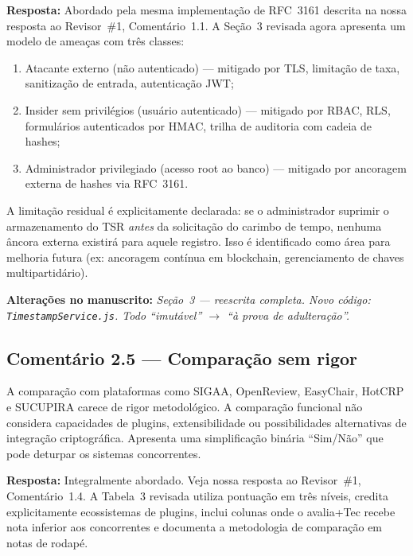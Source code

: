 \documentclass[11pt,a4paper]{article}
\newcommand{\response}[1]{\par\noindent\textcolor{responsecolor}{\textbf{Resposta:}} #1}
\newcommand{\change}[1]{\par\noindent\textcolor{changecolor}{\textbf{Alterações no manuscrito:}} \textit{#1}}
\begin{document}
\response{Abordado pela mesma implementação de RFC~3161 descrita na nossa resposta ao Revisor~\#1, Comentário~1.1. A Seção~3 revisada agora apresenta um modelo de ameaças com três classes:}

\begin{enumerate}[nosep]
  \item Atacante externo (não autenticado) --- mitigado por TLS, limitação de taxa, sanitização de entrada, autenticação JWT;
  \item Insider sem privilégios (usuário autenticado) --- mitigado por RBAC, RLS, formulários autenticados por HMAC, trilha de auditoria com cadeia de hashes;
  \item Administrador privilegiado (acesso root ao banco) --- mitigado por ancoragem externa de hashes via RFC~3161.
\end{enumerate}

\noindent A limitação residual é explicitamente declarada: se o administrador suprimir o armazenamento do TSR \emph{antes} da solicitação do carimbo de tempo, nenhuma âncora externa existirá para aquele registro. Isso é identificado como área para melhoria futura (ex: ancoragem contínua em blockchain, gerenciamento de chaves multipartidário).

\change{Seção~3 --- reescrita completa. Novo código: \texttt{TimestampService.js}. Todo ``imutável'' $\to$ ``à prova de adulteração''.}

\bigskip

\subsection*{Comentário 2.5 --- Comparação sem rigor}

\begin{reviewerbox}
A comparação com plataformas como SIGAA, OpenReview, EasyChair, HotCRP e SUCUPIRA carece de rigor metodológico. A comparação funcional não considera capacidades de plugins, extensibilidade ou possibilidades alternativas de integração criptográfica. Apresenta uma simplificação binária ``Sim/Não'' que pode deturpar os sistemas concorrentes.
\end{reviewerbox}

\response{Integralmente abordado. Veja nossa resposta ao Revisor~\#1, Comentário~1.4. A Tabela~3 revisada utiliza pontuação em três níveis, credita explicitamente ecossistemas de plugins, inclui colunas onde o avalia+Tec recebe nota inferior aos concorrentes e documenta a metodologia de comparação em notas de rodapé.}
\end{document}

